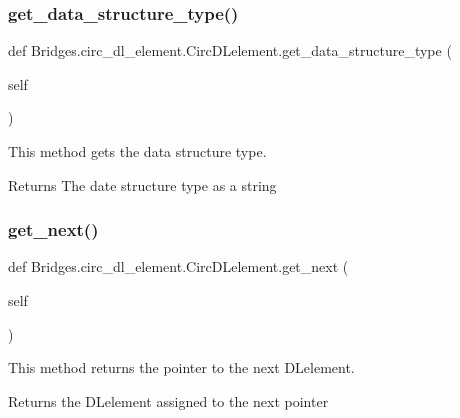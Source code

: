 \subsubsection{\texorpdfstring{get\+\_\+data\+\_\+structure\+\_\+type()}{get\_data\_structure\_type()}}
{\footnotesize\ttfamily def Bridges.\+circ\+\_\+dl\+\_\+element.\+Circ\+D\+Lelement.\+get\+\_\+data\+\_\+structure\+\_\+type (\begin{DoxyParamCaption}\item[{}]{self }\end{DoxyParamCaption})}



This method gets the data structure type. 

\begin{DoxyReturn}{Returns}
The date structure type as a string 
\end{DoxyReturn}
\mbox{\label{class_bridges_1_1circ__dl__element_1_1_circ_d_lelement_a5d52715940d44ce54de49948f55d5991}} 
\subsubsection{\texorpdfstring{get\+\_\+next()}{get\_next()}}
{\footnotesize\ttfamily def Bridges.\+circ\+\_\+dl\+\_\+element.\+Circ\+D\+Lelement.\+get\+\_\+next (\begin{DoxyParamCaption}\item[{}]{self }\end{DoxyParamCaption})}



This method returns the pointer to the next D\+Lelement. 

\begin{DoxyReturn}{Returns}
the D\+Lelement assigned to the next pointer 
\end{DoxyReturn}
\mbox{\label{class_bridges_1_1circ__dl__element_1_1_circ_d_lelement_a1acacbb379727183540f705a48e95500}} 

